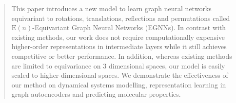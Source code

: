 \documentclass{article}
\newcommand{\En}{\mathrm{E}(n)}
\begin{document}
\begin{abstract}
This paper introduces a new model to learn graph neural networks equivariant to rotations, translations, reflections and permutations called $\En$-Equivariant Graph Neural Networks (EGNNs). In contrast with existing methods, our work does not require computationally expensive higher-order representations in intermediate layers while it still achieves competitive or better performance. In addition, whereas existing methods are limited to equivariance on $3$ dimensional spaces, our model is easily scaled to higher-dimensional spaces. We demonstrate the effectiveness of our method on dynamical systems modelling, representation learning in graph autoencoders and predicting molecular properties.
\end{abstract}


%

%










\onecolumn

\end{document}

